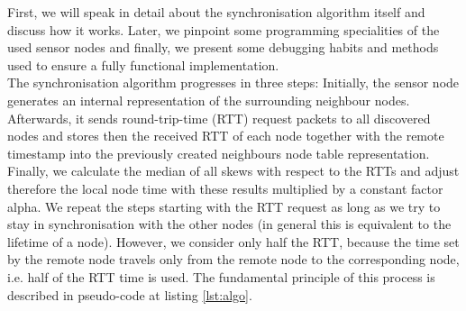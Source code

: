 \documentclass{llncs}
\begin{document}
First, we will speak in detail about the synchronisation algorithm itself and discuss how it works. Later, we pinpoint some programming specialities of the used sensor nodes and finally, we present some debugging habits and methods used to ensure a fully functional implementation.\\
\indent The synchronisation algorithm progresses in three steps: Initially, the sensor node generates an internal representation of the surrounding neighbour nodes. Afterwards, it sends round-trip-time (RTT) request packets to all discovered nodes and stores then the received RTT of each node together with the remote timestamp into the previously created neighbours node table representation. Finally, we calculate the median of all skews with respect to the RTTs and adjust therefore the local node time with these results multiplied by a constant factor alpha. We repeat the steps starting with the RTT request as long as we try to stay in synchronisation with the other nodes (in general this is equivalent to the lifetime of a node).
However, we consider only half the RTT, because the time set by the remote node travels only from the remote node to the corresponding node, i.e. half of the RTT time is used. The fundamental principle of this process is described in pseudo-code at listing \ref{lst:algo}.
\end{document}
